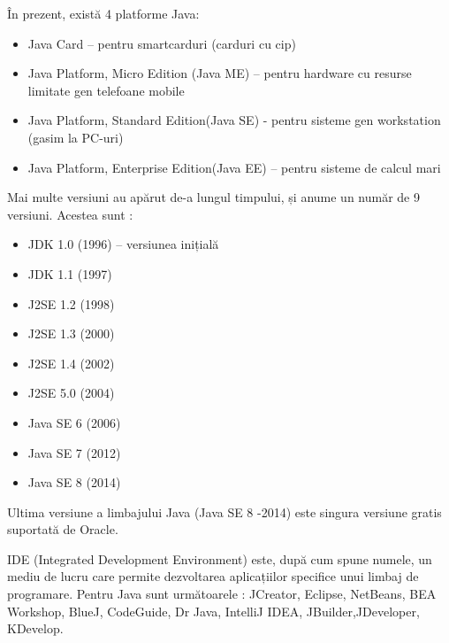 \documentclass[12pt]{book}
\begin{document}
În prezent, există 4 platforme Java:
\begin{addmargin}[4em]{1em}
\begin{itemize}
	\item Java Card – pentru smartcarduri (carduri cu cip)
	\item Java Platform, Micro Edition (Java ME) – pentru hardware cu resurse limitate gen telefoane mobile
	\item Java Platform, Standard Edition(Java SE) - pentru sisteme gen workstation (gasim la PC-uri)
	\item Java Platform, Enterprise Edition(Java EE) – pentru sisteme de calcul mari \cite{thinkJava}
\end{itemize}
\end{addmargin}
\bigbreak
Mai multe versiuni au apărut de-a lungul timpului, și anume un număr de 9 versiuni. Acestea sunt :
\begin{addmargin}[4em]{1em}
\begin{itemize}
\item JDK 1.0 (1996) – versiunea inițială
\item JDK 1.1 (1997)
\item J2SE 1.2 (1998)
\item J2SE 1.3 (2000)
\item J2SE 1.4 (2002)
\item J2SE 5.0 (2004)
\item Java SE 6 (2006)
\item Java SE 7 (2012)
\item Java SE 8 (2014) 
\end{itemize}
\end{addmargin}
\bigbreak
Ultima versiune a limbajului Java (Java SE 8 -2014) este singura versiune gratis suportată de Oracle. \cite{cursPracticJava}
	
IDE (Integrated Development Environment) este, după cum spune numele, un mediu de lucru care permite dezvoltarea aplicațiilor specifice unui limbaj de programare. Pentru Java sunt următoarele : JCreator, Eclipse, NetBeans, BEA Workshop, BlueJ, CodeGuide, Dr Java, IntelliJ IDEA, JBuilder,JDeveloper, KDevelop.
	
\end{document}
